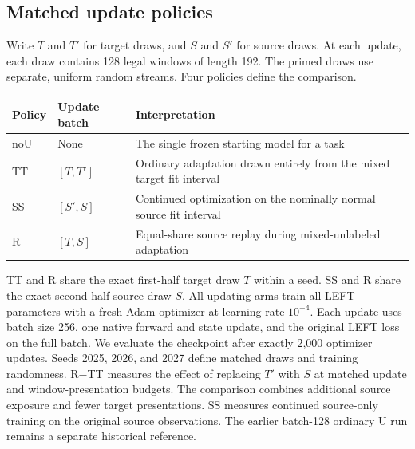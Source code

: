 \documentclass[
  american,
]{article}
\begin{document}
\subsection{Matched update policies}\label{matched-update-policies}

Write \(T\) and \(T'\) for target draws, and \(S\) and \(S'\) for source
draws. At each update, each draw contains 128 legal windows of length
192. The primed draws use separate, uniform random streams. Four
policies define the comparison.

\begin{longtable}[]{@{}
  >{\raggedright\arraybackslash}p{}
  >{\raggedright\arraybackslash}p{}
  >{\raggedright\arraybackslash}p{}@{}}
\toprule\noalign{}
\begin{minipage}[b]{\linewidth}\raggedright
Policy
\end{minipage} & \begin{minipage}[b]{\linewidth}\raggedright
Update batch
\end{minipage} & \begin{minipage}[b]{\linewidth}\raggedright
Interpretation
\end{minipage} \\
\midrule\noalign{}
\endhead
\bottomrule\noalign{}
\endlastfoot
noU & None & The single frozen starting model for a task \\
TT & \([T,T']\) & Ordinary adaptation drawn entirely from the mixed
target fit interval \\
SS & \([S',S]\) & Continued optimization on the nominally normal source
fit interval \\
R & \([T,S]\) & Equal-share source replay during mixed-unlabeled
adaptation \\
\end{longtable}

TT and R share the exact first-half target draw \(T\) within a seed. SS
and R share the exact second-half source draw \(S\). All updating arms
train all LEFT parameters with a fresh Adam optimizer at learning rate
\(10^{-4}\). Each update uses batch size 256, one native forward and
state update, and the original LEFT loss on the full batch. We evaluate
the checkpoint after exactly 2,000 optimizer updates. Seeds 2025, 2026,
and 2027 define matched draws and training randomness. R−TT measures the
effect of replacing \(T'\) with \(S\) at matched update and
window-presentation budgets. The comparison combines additional source
exposure and fewer target presentations. SS measures continued
source-only training on the original source observations. The earlier
batch-128 ordinary U run remains a separate historical reference.
\end{document}
